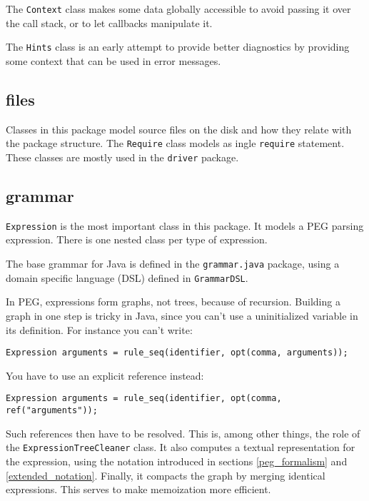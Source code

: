 The \texttt{Context} class makes some data globally accessible to avoid passing
it over the call stack, or to let callbacks manipulate it.

The \texttt{Hints} class is an early attempt to provide better diagnostics by
providing some context that can be used in error messages.

\subsection{files}

Classes in this package model source files on the disk and how they relate with
the package structure. The \texttt{Require} class models as ingle
\texttt{require} statement. These classes are mostly used in the \texttt{driver}
package.

\subsection{grammar}
\label{implem_grammar}

\texttt{Expression} is the most important class in this package. It models a PEG
parsing expression. There is one nested class per type of expression.

The base grammar for Java is defined in the \texttt{grammar.java} package, using
a domain specific language (DSL) defined in \texttt{GrammarDSL}.

In PEG, expressions form graphs, not trees, because of recursion. Building a
graph in one step is tricky in Java, since you can't use a uninitialized
variable in its definition. For instance you can't write:

\begin{lstlisting}
Expression arguments = rule_seq(identifier, opt(comma, arguments));
\end{lstlisting}

You have to use an explicit reference instead:

\begin{lstlisting}
Expression arguments = rule_seq(identifier, opt(comma, ref("arguments"));
\end{lstlisting}

Such references then have to be resolved. This is, among other things, the role
of the \texttt{ExpressionTreeCleaner} class. It also computes a textual
representation for the expression, using the notation introduced in sections
\ref{peg_formalism} and \ref{extended_notation}. Finally, it compacts the graph
by merging identical expressions. This serves to make memoization more
efficient.

